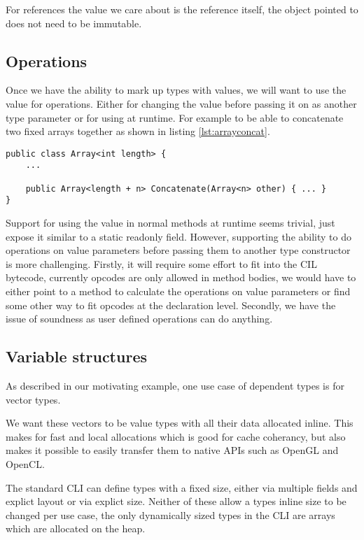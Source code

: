 For references the value we care about is the reference itself, the object pointed to does not need to be immutable.

\subsection{Operations}

Once we have the ability to mark up types with values, we will want
to use the value for operations. Either for changing the value before
passing it on as another type parameter or for using at runtime. 
For example to be able to concatenate two fixed arrays together as shown in listing \ref{lst:arrayconcat}.

\begin{lstlisting}[label={lst:arrayconcat},caption={Concatenate two arrays},keywordstyle={\color{blue}},language=sharpc]
public class Array<int length> { 
	...
	
	public Array<length + n> Concatenate(Array<n> other) { ... }
}
\end{lstlisting}

Support for using the value in normal methods at runtime seems trivial, just
expose it similar to a static readonly field. However, supporting the
ability to do operations on value parameters before passing them to
another type constructor is more challenging. Firstly, it will require
some effort to fit into the CIL bytecode, currently opcodes are only
allowed in method bodies, we would have to either point to a method
to calculate the operations on value parameters or find some other
way to fit opcodes at the declaration level. Secondly, we have the
issue of soundness as user defined operations can do anything.

\subsection{Variable structures}

As described in our motivating example, one use case of dependent types is for vector types.

We want these vectors to be value types with all their data allocated inline. This makes for fast and local
allocations which is good for cache coherancy, but also makes it possible to easily transfer them to native
APIs such as OpenGL and OpenCL.

The standard CLI can define types with a fixed size, either via multiple fields and explict layout or via explict size.
Neither of these allow a types inline size to be changed per use case, the only dynamically sized types in the CLI are
arrays which are allocated on the heap.

